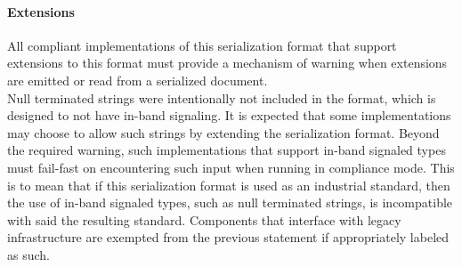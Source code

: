 \paragraph{Extensions}
All compliant implementations of this serialization format that support extensions to this format must provide a mechanism of warning when extensions are emitted or read from a serialized document.\\
Null terminated strings were intentionally not included in the format, which is designed to not have in-band signaling. It is expected that some implementations may choose to allow such strings by extending the serialization format. Beyond the required warning, such implementations that support in-band signaled types must fail-fast on encountering such input when running in compliance mode. This is to mean that if this serialization format is used as an industrial standard, then the use of in-band signaled types, such as null terminated strings, is incompatible with said the resulting standard. Components that interface with legacy infrastructure are exempted from the previous statement if appropriately labeled as such.